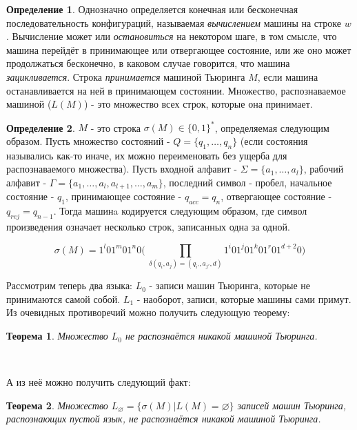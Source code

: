 \documentclass[a4paper]{article}
\theoremstyle{indented}
\newtheorem{theorem}{Теорема}
\theoremstyle{definition}
\newtheorem{defn}{Определение}
\theoremstyle{remark}
\begin{document}
\begin{defn}
    Однозначно определяется конечная или бесконечная последовательность конфигураций, называемая \textit{вычислением} машины на строке $w$. Вычисление может или \textit{остановиться} на некотором шаге, в том смысле, что машина перейдёт в принимающее или отвергающее состояние, или же оно может продолжаться бесконечно, в каковом случае говорится, что машина \textit{зацикливается}. Строка \textit{принимается} машиной Тьюринга $M$, если машина останавливается на ней в принимающем состоянии. Множество, распознаваемое машиной ($L(M)$) - это множество всех строк, которые она принимает.
\end{defn}

\begin{defn}
     $M$ - это строка $\sigma(M) \in \{0,1\}^*$, определяемая следующим образом. Пусть множество состояний - $Q = \{q_1, \ldots, q_n\}$ (если состояния назывались как-то иначе, их можно переименовать без ущерба для распознаваемого множества). Пусть входной алфавит - $\Sigma = \{a_1, \ldots, a_l\}$, рабочий алфавит - $\Gamma = \{a_1, \ldots , a_l, a_{l+1}, \ldots , a_m\}$, последний символ - пробел, начальное состояние - $q_1$, принимающее состояние - $q_{acc} = q_n$, отвергающее состояние - $q_{rej} = q_{n-1}$. Тогда машинa кодируется следующим образом, где символ произведения означает несколько строк, записанных одна за одной.

    \[
        \sigma(M) = 1^l01^m01^n0 \biggl( \: \prod_{\delta(q_i, a_j) = (q_{i'}, a_{j'}, d)} 1^i 0 1^j 0 1^k 0 1^r 0 1^{d+2} 0 \biggr)
    \]
\end{defn}

Рассмотрим теперь два языка: $L_0$ - записи машин Тьюринга, которые не принимаются самой собой. $L_1$ - наоборот, записи, которые машины сами примут. Из очевидных противоречий можно получить следующую теорему: \\ 

\begin{theorem}
    Множество $L_0$ не распознаётся никакой машиной Тьюринга.
\end{theorem} \ 

А из неё можно получить следующий факт: \\ 

\begin{theorem}
    Множество $L_{\varnothing} = \{ \sigma(M) | L(M) = \varnothing\}$ записей машин Тьюринга, распознающих пустой язык, не распознаётся никакой машиной Тьюринга.
\end{theorem}
\end{document}
